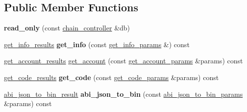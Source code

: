 \subsection*{Public Member Functions}
\begin{DoxyCompactItemize}
\item 
\mbox{\label{classaacio_1_1chain__apis_1_1read__only_ac97f56e35a71d7da01beaf9e687b0947}} 
{\bfseries read\+\_\+only} (const \mbox{\hyperlink{classaacio_1_1chain_1_1chain__controller}{chain\+\_\+controller}} \&db)
\item 
\mbox{\label{classaacio_1_1chain__apis_1_1read__only_a639e6f4724e8c06514af99a9c414e119}} 
\mbox{\hyperlink{structaacio_1_1chain__apis_1_1read__only_1_1get__info__results}{get\+\_\+info\+\_\+results}} {\bfseries get\+\_\+info} (const \mbox{\hyperlink{structaacio_1_1chain__apis_1_1empty}{get\+\_\+info\+\_\+params}} \&) const
\item 
\mbox{\hyperlink{structaacio_1_1chain__apis_1_1read__only_1_1get__account__results}{get\+\_\+account\+\_\+results}} \mbox{\hyperlink{classaacio_1_1chain__apis_1_1read__only_a73489f54a3810e8cf7ba7545674d023a}{get\+\_\+account}} (const \mbox{\hyperlink{structaacio_1_1chain__apis_1_1read__only_1_1get__account__params}{get\+\_\+account\+\_\+params}} \&params) const
\item 
\mbox{\label{classaacio_1_1chain__apis_1_1read__only_a9b68f04b10c29df8827d44f41a05ca4a}} 
\mbox{\hyperlink{structaacio_1_1chain__apis_1_1read__only_1_1get__code__results}{get\+\_\+code\+\_\+results}} {\bfseries get\+\_\+code} (const \mbox{\hyperlink{structaacio_1_1chain__apis_1_1read__only_1_1get__code__params}{get\+\_\+code\+\_\+params}} \&params) const
\item 
\mbox{\label{classaacio_1_1chain__apis_1_1read__only_ae1280d2a34d80f645e9c052fd72bb473}} 
\mbox{\hyperlink{structaacio_1_1chain__apis_1_1read__only_1_1abi__json__to__bin__result}{abi\+\_\+json\+\_\+to\+\_\+bin\+\_\+result}} {\bfseries abi\+\_\+json\+\_\+to\+\_\+bin} (const \mbox{\hyperlink{structaacio_1_1chain__apis_1_1read__only_1_1abi__json__to__bin__params}{abi\+\_\+json\+\_\+to\+\_\+bin\+\_\+params}} \&params) const
\item 
\mbox{\label{classaacio_1_1chain__apis_1_1read__only_a49ab1fb86c34fa2cae1fd00db6b5fb67}} 

\end{DoxyCompactItemize}

